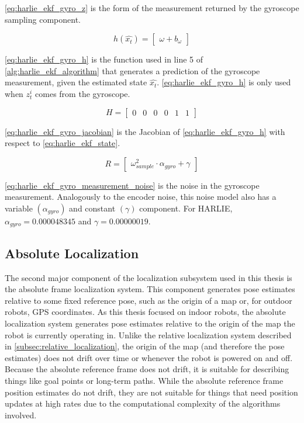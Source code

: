 \eqref{eq:harlie_ekf_gyro_z} is the form of the measurement returned by the gyroscope sampling component.

\begin{equation}
	h\left(\hat{x_t}\right) =
	\begin{bmatrix}
		\omega + b_{\omega}
	\end{bmatrix}
	\label{eq:harlie_ekf_gyro_h}
\end{equation}

\eqref{eq:harlie_ekf_gyro_h} is the function used in line 5 of \autoref{alg:harlie_ekf_algorithm} that generates a prediction of the gyroscope measurement, given the estimated state $\hat{x_t}$. \eqref{eq:harlie_ekf_gyro_h} is only used when $z_t^i$ comes from the gyroscope.

\begin{equation}
	H =
	\begin{bmatrix}
		0 & 0 & 0 & 0 & 1 & 1
	\end{bmatrix}
	\label{eq:harlie_ekf_gyro_jacobian}
\end{equation}

\eqref{eq:harlie_ekf_gyro_jacobian} is the Jacobian of \eqref{eq:harlie_ekf_gyro_h} with respect to \eqref{eq:harlie_ekf_state}.

\begin{equation}
	R =
	\begin{bmatrix}
		\omega_{sample}^2 \cdot \alpha_{gyro} + \gamma
	\end{bmatrix}
	\label{eq:harlie_ekf_gyro_measurement_noise}
\end{equation}

\eqref{eq:harlie_ekf_gyro_measurement_noise} is the noise in the gyroscope measurement. Analogously to the encoder noise, this noise model also has a variable $\left(\alpha_{gyro}\right)$ and constant $\left(\gamma\right)$ component. For HARLIE, $\alpha_{gyro} = 0.000048345$ and $\gamma = 0.00000019$.

\subsection{Absolute Localization}\label{subsec:absolute_localization}

The second major component of the localization subsystem used in this thesis is the absolute frame localization system. This component generates pose estimates relative to some fixed reference pose, such as the origin of a map or, for outdoor robots, GPS coordinates. As this thesis focused on indoor robots, the absolute localization system generates pose estimates relative to the origin of the map the robot is currently operating in. Unlike the relative localization system described in \autoref{subsec:relative_localization}, the origin of the map (and therefore the pose estimates) does not drift over time or whenever the robot is powered on and off. Because the absolute reference frame does not drift, it is suitable for describing things like goal points or long-term paths. While the absolute reference frame position estimates do not drift, they are not suitable for things that need position updates at high rates due to the computational complexity of the algorithms involved.

